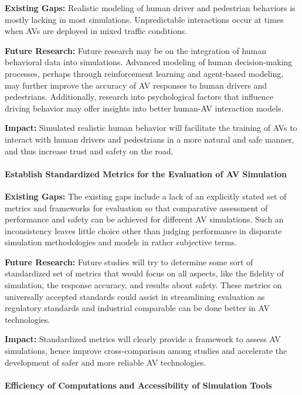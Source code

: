 \documentclass[lettersize,journal]{IEEEtran}
\begin{document}
\textbf{Existing Gaps:} Realistic modeling of human driver and pedestrian behaviors is mostly lacking in most simulations. Unpredictable interactions occur at times when AVs are deployed in mixed traffic conditions.

\textbf{Future Research:} Future research may be on the integration of human behavioral data into simulations. Advanced modeling of human decision-making processes, perhaps through reinforcement learning and agent-based modeling, may further improve the accuracy of AV responses to human drivers and pedestrians. Additionally, research into psychological factors that influence driving behavior may offer insights into better human-AV interaction models.

\textbf{Impact:} Simulated realistic human behavior will facilitate the training of AVs to interact with human drivers and pedestrians in a more natural and safe manner, and thus increase trust and safety on the road.

\paragraph{Establish Standardized Metrics for the Evaluation of AV Simulation}

\textbf{Existing Gaps:} The existing gaps include a lack of an explicitly stated set of metrics and frameworks for evaluation so that comparative assessment of performance and safety can be achieved for different AV simulations. Such an inconsistency leaves little choice other than judging performance in disparate simulation methodologies and models in rather subjective terms.

\textbf{Future Research:} Future studies will try to determine some sort of standardized set of metrics that would focus on all aspects, like the fidelity of simulation, the response accuracy, and results about safety. These metrics on universally accepted standards could assist in streamlining evaluation as regulatory standards and industrial comparable can be done better in AV technologies.

\textbf{Impact:} Standardized metrics will clearly provide a framework to assess AV simulations, hence improve cross-comparison among studies and accelerate the development of safer and more reliable AV technologies.

\paragraph{Efficiency of Computations and Accessibility of Simulation Tools}
\end{document}
